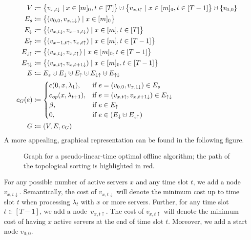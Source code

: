 \begin{align*}
	V&\coloneqq\bigl\{v_{x,t\downarrow}\mid x\in[m]_0,t\in[T]\bigr\}\dotcup\bigl\{v_{x,t\uparrow}\mid x\in[m]_0,t\in[T-1]\bigr\}\dotcup\{v_{0,0}\}\\
	E_s&\coloneqq\bigl\{(v_{0,0},v_{x,1\downarrow})\mid x\in[m]_0\bigr\}\\
	E_\downarrow&\coloneqq\bigl\{(v_{x,t\downarrow},v_{x-1,t\downarrow})\mid x\in[m],t\in[T]\bigr\}\\
	E_\uparrow&\coloneqq\bigl\{(v_{x-1,t\uparrow},v_{x,t\uparrow})\mid x\in[m],t\in[T-1]\bigr\}\\
	E_{\downarrow\uparrow}&\coloneqq\bigl\{(v_{x,t\downarrow},v_{x,t\uparrow})\mid x\in[m]_0,t\in[T-1]\bigr\}\\
	E_{\uparrow\downarrow}&\coloneqq\bigl\{(v_{x,t\uparrow},v_{x,t+1\downarrow})\mid x\in[m]_0,t\in[T-1]\bigr\}\\
	E&\coloneqq E_s\dotcup E_\downarrow\dotcup E_\uparrow\dotcup E_{\downarrow\uparrow}\dotcup E_{\uparrow\downarrow}\\
	c_G(e)&\coloneqq
	\begin{cases}
		\costs(0,x,\lambda_1), & \text{if $e=(v_{0,0},v_{x,1\downarrow})\in E_s$}\\
		\opcosts(x,\lambda_{t+1}), & \text{if $e=(v_{x,t\uparrow},v_{x,t+1\downarrow})\in E_{\uparrow\downarrow}$}\\
		\beta, & \text{if $e\in E_\uparrow$}\\
		0, & \text{if $e\in(E_\downarrow\dotcup E_{\downarrow\uparrow})$}
	\end{cases}\\
	G&\coloneqq(V,E,c_G)
\end{align*}
A more appealing, graphical representation can be found in the following figure.
\begin{figure}[H]

\caption{Graph for a pseudo-linear-time optimal offline algorithm; the path of the topological sorting is highlighted in red.}
\label{fig:graph_pseudo_lin}
\end{figure}
For any possible number of active servers $x$ and any time slot $t$, we add a node~$v_{x,t\downarrow}$. Semantically, the cost of $v_{x,t\downarrow}$ will denote the minimum cost up to time slot $t$ when processing $\lambda_t$ with $x$ or more servers. Further, for any time slot $t\in[T-1]$, we add a node~$v_{x,t\uparrow}$. The cost of $v_{x,t\uparrow}$ will denote the minimum cost of having $x$ active servers at the end of time slot $t$. Moreover, we add a start node $v_{0,0}$.

